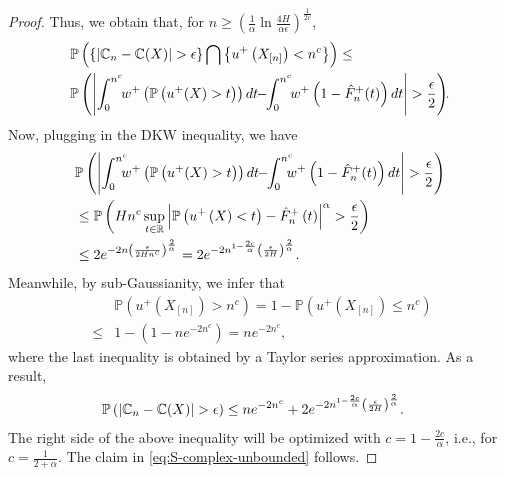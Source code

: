 \begin{proof}
Thus, we obtain that, for $n \geq \left(\frac{1}{\alpha} \ln\frac{4H}{\alpha \epsilon} \right)^{\frac{1}{2c}}$, 
\begin{align*}
&\mathbb{P}\left(\{\left|\C_n -\C(X) \right| > \epsilon\} \bigcap \left\{u^+\left(X_{[n]}\right) < n^c\right\}\right)\leq \\ 
&\mathbb{P}\left(\left|\int_0^{n^c}\!\! w^+ \left(\Prob{u^+(X)>t}\right)dt \!\!-\!\! 
\int_0^{n^c}\!\!w^+\left(1- {\hat F^+_n}(t)\right) dt\right| > \frac{\epsilon}{2}\right)\!\!.
\end{align*}
Now, plugging in the DKW inequality, we have
\begin{align}
&\mathbb{P}\left(\left|\int_0^{n^c}\!\!\!\! w^+\left(\Prob{u^+(X)>t}\right) dt \!\!-\!\! \int_0^{n^c}\!\!\!\! w^+\left(1- {\hat F^+_n}(t)\right) dt\right|>\frac{\epsilon}{2}\right)
\nonumber\\
& \leq \mathbb{P}\left(Hn^c\sup_{t\in \mathbb{R}} \left|\Prob{u^+\left(X\right)<t}-{\hat F^+_n}\left(t\right)\right|^\alpha > \frac{\epsilon}{2}\right)
\nonumber\\
&
\leq  2 e^{-2n \left(\frac{\epsilon}{2Hn^c} \right)^\frac{2}{\alpha}} = 
2 e^{-2n^{1-\frac{2c}{\alpha}}\left(\frac{\epsilon}{2H}\right)^{\frac{2}{\alpha}}} .\label{eq:dkw3}
\end{align}
Meanwhile, by sub-Gaussianity, we infer that
\begin{align*}
\,\,&\mathbb{P}\left(u^+ \left(X_{[n]}\right) >  n^c \right) = 1- \mathbb{P}\left(u^+ \left(X_{[n]} \right) \leq n^c \right)\\
\,\,\leq &1- \left(1- ne^{-2n^c} \right) = ne^{-2n^c},
\end{align*}
where the last inequality is obtained by a Taylor series approximation.
As a result, 
\begin{align*}
& \mathbb{P}\left(\left|\mathbb{C}_n -\mathbb{C}(X) \right| > \epsilon \right) 
\leq n e ^{-2n^c} + 2 e^{-2n^{1-\frac{2c}{\alpha}}\left(\frac{\epsilon}{2H}\right)^{\frac{2}{\alpha}}}.
\end{align*}
The right side of the above inequality will be optimized with $c = 1 - \frac{2c}{\alpha}$, i.e., for $c = \frac{1}{2+\alpha}$. The claim in \eqref{eq:S-complex-unbounded} follows.


\end{proof}
